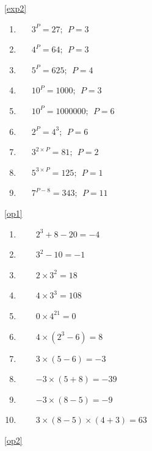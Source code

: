 \documentclass[a4paper,12pt]{article}
\begin{document}
\ref{exp2}
\begin{multicols}{3}
	\begin{enumerate}[label=\footnotesize \roman*)]
		\item~~~$\displaystyle 3^P=27;~~P=3$
		\item~~~$\displaystyle 4^P=64;~~P=3$
		\item~~~$\displaystyle 5^P=625;~~P=4$
		\item~~~$\displaystyle 10^P=1000;~~P=3$
		\item~~~$\displaystyle 10^P=1000000;~~P=6$
		\item~~~$\displaystyle 2^P=4^3;~~P=6$
		\item~~~$\displaystyle 3^{2 \times P}=81;~~P=2$
		\item~~~$\displaystyle 5^{3 \times P}=125;~~P=1$
		\item~~~$\displaystyle 7^{P-8}=343;~~P=11$
	\end{enumerate}
\end{multicols}
\ref{op1}
	\begin{multicols}{2}
	\begin{enumerate}[label=\footnotesize \roman*)]
		\item ~~~~$2^3+8-20=-4$
		\item ~~~~$3^{2}-10=-1$
		\item ~~~~$2\times3^2=18$
		\item ~~~~$4\times3^3=108$
		\item ~~~~$0\times4^{21}=0$
		\item ~~~~$4\times(2^3-6)=8$
		\item ~~~~$3\times(5-6)=-3$
		\item ~~~~$-3\times(5+8)=-39$
		\item ~~~~$-3\times(8-5)=-9$
		\item ~~~~$3\times(8-5)\times(4+3)=63$
	\end{enumerate}
\end{multicols}
\ref{op2}
\end{document}

